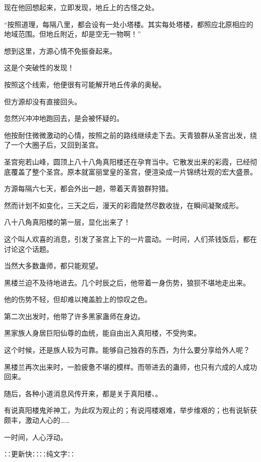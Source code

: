 \begin{this_body}
现在他回想起来，立即发现，地丘上的古怪之处。

“按照道理，每隔八里，都会设有一处小塔楼。其实每处塔楼，都照应北原相应的地域范围。但地丘附近，却是空无一物啊！”

想到这里，方源心情不免振奋起来。

这是个突破性的发现！

按照这个线索，他便很有可能解开地丘传承的奥秘。

但方源却没有直接回头。

忽然兴冲冲地跑回去，是会被怀疑的。

他按耐住微微激动的心情，按照之前的路线继续走下去。天青狼群从圣宫出发，绕了一个大圈子后，又回到圣宫。

圣宫宛若山峰，圆顶上八十八角真阳楼还在孕育当中。它散发出来的彩霞，已经彻底覆盖了整个圣宫。原本就富丽堂皇的圣宫，便渲染成一片锦绣壮观的宏大盛景。

方源每隔六七天，都会外出一趟，带着天青狼群狩猎。

然而计划不如变化，三天之后，漫天的彩霞陡然尽数收拢，在瞬间凝聚成形。

八十八角真阳楼的第一层，显化出来了！

这个叫人欢喜的消息，引发了圣宫上下的一片震动。一时间，人们茶钱饭后，都在讨论这个话题。

当然大多数蛊师，都只能观望。

黑楼兰迫不及待地进去。几个时辰之后，他带着一身伤势，狼狈不堪地走出来。

他的伤势不轻，但却难以掩盖脸上的惊叹之色。

第二次出发时，他带了许多黑家蛊师在身边。

黑家族人身居巨阳仙尊的血统，能自由出入真阳楼，不受拘束。

这个时候，还是族人较为可靠。能够自己独吞的东西，为什么要分享给外人呢？

黑楼兰再次出来时，一脸疲惫不堪的模样。而带进去的蛊师，也只有六成的人成功回来。

随后，各种小道消息风传开来，都是关于真阳楼、。

有说真阳楼鬼斧神工，为此叹为观止的；有说闯楼艰难，举步维艰的；也有说斩获颇丰，激动人心的……

一时间，人心浮动。

∷更新快∷∷纯文字∷

\end{this_body}

